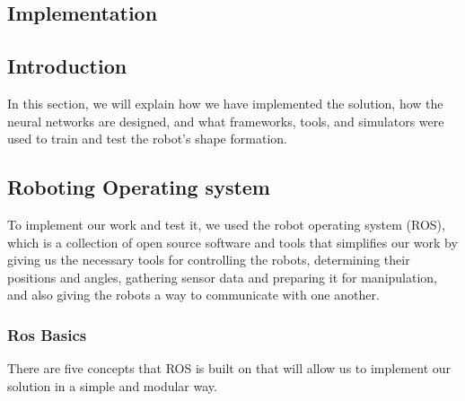 \documentclass[12pt]{extarticle}
\begin{document}
\afterpage{\clearpage}

\newpage
\pagebreak
\hspace{0pt}
\vfill
\begin{center}
\section{Implementation}
\end{center}
\vfill
\hspace{0pt}

\pagebreak




\subsection{Introduction}
In this section, we will explain how we have implemented the solution, how the neural networks are designed, and what frameworks, tools, and simulators were used to train and test the robot's shape formation.











\subsection{Roboting Operating system}
To implement our work and test it, we used the robot operating system (ROS), which is a collection of open source software and tools that simplifies our work by giving us the necessary tools for controlling the robots, determining their positions and angles, gathering sensor data and preparing it for manipulation, and also giving the robots a way to communicate with one another.
\subsubsection{Ros Basics}
There are five concepts that ROS is built on that will allow us to implement our solution in a simple and modular way.


 
\end{document}
